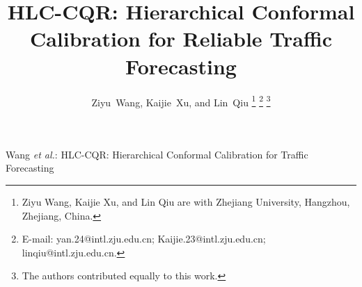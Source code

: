 \documentclass[letterpaper,journal]{IEEEtran}
\begin{document}
\title{HLC-CQR: Hierarchical Conformal Calibration for Reliable Traffic Forecasting}

\author{Ziyu~Wang, Kaijie~Xu, and Lin~Qiu%
\thanks{Ziyu Wang, Kaijie Xu, and Lin Qiu are with Zhejiang University, Hangzhou, Zhejiang, China.}%
\thanks{E-mail: yan.24@intl.zju.edu.cn; Kaijie.23@intl.zju.edu.cn; linqiu@intl.zju.edu.cn.}%
\thanks{The authors contributed equally to this work.}}

%
{Wang \MakeLowercase{\textit{et al.}}: HLC-CQR: Hierarchical Conformal Calibration for Traffic Forecasting}

\maketitle
\end{document}

